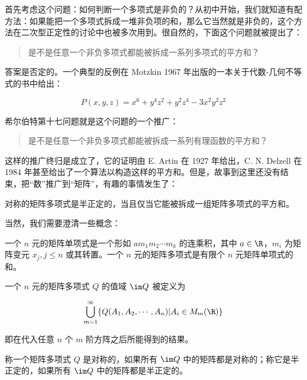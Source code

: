 首先考虑这个问题：如何判断一个多项式是非负的？从初中开始，我们就知道有配方法：如果能把一个多项式拆成一堆非负项的和，那么它当然就是非负的，这个方法在二次型正定性的讨论中也被多次用到。很自然的，下面这个问题就被提出了：

\begin{quote}
\kaishu
是不是任意一个非负多项式都能被拆成一系列多项式的平方和？
\end{quote}

答案是否定的。一个典型的反例在 Motzkin 1967 年出版的一本关于代数-几何不等式的书中给出：

\[
P(x, y, z) = x^6 + y^4z^2 + y^2z^4 -3x^2y^2z^2
\]

希尔伯特第十七问题就是这个问题的一个推广：

\begin{quote}
\kaishu
是不是任意一个非负多项式都能被拆成一系列有理函数的平方和？
\end{quote}

这样的推广终归是成立了，它的证明由 E. Artin 在 1927 年给出，C. N. Delzell 在 1984 年甚至给出了一个算法以构造这样的平方和。但是，故事到这里还没有结束，把“数”推广到“矩阵”，有趣的事情发生了：

\begin{theorem}[Helton, 2002]\label{helton2002}
    对称的矩阵多项式是半正定的，当且仅当它能被拆成一组矩阵多项式的平方和。
\end{theorem}

当然，我们需要澄清一些概念：

\begin{definition}
    一个 $n$ 元的矩阵单项式是一个形如 $am_1m_2 \cdots m_k$ 的连乘积，其中 $a \in \R$，$m_i$ 为矩阵变元 $x_j, j \leqslant n$ 或其转置。一个 $n$ 元的矩阵多项式是有限个 $n$ 元矩阵单项式的和。
\end{definition}

\begin{definition}
    一个 $n$ 元的矩阵多项式 $Q$ 的值域 $\im Q$ 被定义为

    \[
    \bigcup_{m = 1}^\infty\{Q(A_1, A_2, \cdots, A_n) | A_i \in M_m(\R)\}
    \]

    即在代入任意 $n$ 个 $m$ 阶方阵之后所能得到的结果。
\end{definition}

\begin{definition}
    称一个矩阵多项式 $Q$ 是对称的，如果所有 $\im Q$ 中的矩阵都是对称的；称它是半正定的，如果所有 $\im Q$ 中的矩阵都是半正定的。
\end{definition}

